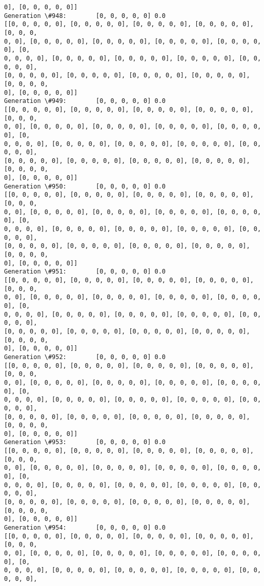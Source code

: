 \documentclass[11pt]{article}
\begin{document}
\begin{Verbatim}[commandchars=\\\{\}]
0], [0, 0, 0, 0, 0]]
Generation \#948:        [0, 0, 0, 0, 0] 0.0
[[0, 0, 0, 0, 0], [0, 0, 0, 0, 0], [0, 0, 0, 0, 0], [0, 0, 0, 0, 0], [0, 0, 0,
0, 0], [0, 0, 0, 0, 0], [0, 0, 0, 0, 0], [0, 0, 0, 0, 0], [0, 0, 0, 0, 0], [0,
0, 0, 0, 0], [0, 0, 0, 0, 0], [0, 0, 0, 0, 0], [0, 0, 0, 0, 0], [0, 0, 0, 0, 0],
[0, 0, 0, 0, 0], [0, 0, 0, 0, 0], [0, 0, 0, 0, 0], [0, 0, 0, 0, 0], [0, 0, 0, 0,
0], [0, 0, 0, 0, 0]]
Generation \#949:        [0, 0, 0, 0, 0] 0.0
[[0, 0, 0, 0, 0], [0, 0, 0, 0, 0], [0, 0, 0, 0, 0], [0, 0, 0, 0, 0], [0, 0, 0,
0, 0], [0, 0, 0, 0, 0], [0, 0, 0, 0, 0], [0, 0, 0, 0, 0], [0, 0, 0, 0, 0], [0,
0, 0, 0, 0], [0, 0, 0, 0, 0], [0, 0, 0, 0, 0], [0, 0, 0, 0, 0], [0, 0, 0, 0, 0],
[0, 0, 0, 0, 0], [0, 0, 0, 0, 0], [0, 0, 0, 0, 0], [0, 0, 0, 0, 0], [0, 0, 0, 0,
0], [0, 0, 0, 0, 0]]
Generation \#950:        [0, 0, 0, 0, 0] 0.0
[[0, 0, 0, 0, 0], [0, 0, 0, 0, 0], [0, 0, 0, 0, 0], [0, 0, 0, 0, 0], [0, 0, 0,
0, 0], [0, 0, 0, 0, 0], [0, 0, 0, 0, 0], [0, 0, 0, 0, 0], [0, 0, 0, 0, 0], [0,
0, 0, 0, 0], [0, 0, 0, 0, 0], [0, 0, 0, 0, 0], [0, 0, 0, 0, 0], [0, 0, 0, 0, 0],
[0, 0, 0, 0, 0], [0, 0, 0, 0, 0], [0, 0, 0, 0, 0], [0, 0, 0, 0, 0], [0, 0, 0, 0,
0], [0, 0, 0, 0, 0]]
Generation \#951:        [0, 0, 0, 0, 0] 0.0
[[0, 0, 0, 0, 0], [0, 0, 0, 0, 0], [0, 0, 0, 0, 0], [0, 0, 0, 0, 0], [0, 0, 0,
0, 0], [0, 0, 0, 0, 0], [0, 0, 0, 0, 0], [0, 0, 0, 0, 0], [0, 0, 0, 0, 0], [0,
0, 0, 0, 0], [0, 0, 0, 0, 0], [0, 0, 0, 0, 0], [0, 0, 0, 0, 0], [0, 0, 0, 0, 0],
[0, 0, 0, 0, 0], [0, 0, 0, 0, 0], [0, 0, 0, 0, 0], [0, 0, 0, 0, 0], [0, 0, 0, 0,
0], [0, 0, 0, 0, 0]]
Generation \#952:        [0, 0, 0, 0, 0] 0.0
[[0, 0, 0, 0, 0], [0, 0, 0, 0, 0], [0, 0, 0, 0, 0], [0, 0, 0, 0, 0], [0, 0, 0,
0, 0], [0, 0, 0, 0, 0], [0, 0, 0, 0, 0], [0, 0, 0, 0, 0], [0, 0, 0, 0, 0], [0,
0, 0, 0, 0], [0, 0, 0, 0, 0], [0, 0, 0, 0, 0], [0, 0, 0, 0, 0], [0, 0, 0, 0, 0],
[0, 0, 0, 0, 0], [0, 0, 0, 0, 0], [0, 0, 0, 0, 0], [0, 0, 0, 0, 0], [0, 0, 0, 0,
0], [0, 0, 0, 0, 0]]
Generation \#953:        [0, 0, 0, 0, 0] 0.0
[[0, 0, 0, 0, 0], [0, 0, 0, 0, 0], [0, 0, 0, 0, 0], [0, 0, 0, 0, 0], [0, 0, 0,
0, 0], [0, 0, 0, 0, 0], [0, 0, 0, 0, 0], [0, 0, 0, 0, 0], [0, 0, 0, 0, 0], [0,
0, 0, 0, 0], [0, 0, 0, 0, 0], [0, 0, 0, 0, 0], [0, 0, 0, 0, 0], [0, 0, 0, 0, 0],
[0, 0, 0, 0, 0], [0, 0, 0, 0, 0], [0, 0, 0, 0, 0], [0, 0, 0, 0, 0], [0, 0, 0, 0,
0], [0, 0, 0, 0, 0]]
Generation \#954:        [0, 0, 0, 0, 0] 0.0
[[0, 0, 0, 0, 0], [0, 0, 0, 0, 0], [0, 0, 0, 0, 0], [0, 0, 0, 0, 0], [0, 0, 0,
0, 0], [0, 0, 0, 0, 0], [0, 0, 0, 0, 0], [0, 0, 0, 0, 0], [0, 0, 0, 0, 0], [0,
0, 0, 0, 0], [0, 0, 0, 0, 0], [0, 0, 0, 0, 0], [0, 0, 0, 0, 0], [0, 0, 0, 0, 0],

\end{Verbatim}
\end{document}
